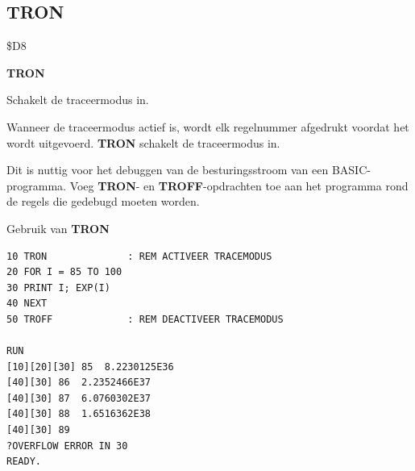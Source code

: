 \subsection{TRON}
\begin{description}[leftmargin=2cm,style=nextline]
\item [Token:]    \$D8

\item [Formaat:]   {\bf TRON}

\item [Gebruik:]    Schakelt de traceermodus in.

                  Wanneer de traceermodus actief is, wordt elk regelnummer afgedrukt voordat het wordt uitgevoerd. {\bf TRON} schakelt de traceermodus in.

                  Dit is nuttig voor het debuggen van de besturingsstroom van een BASIC-programma. Voeg {\bf TRON}- en {\bf TROFF}-opdrachten toe aan het programma rond de regels die gedebugd moeten worden.

\item [Voorbeeld:]  Gebruik van {\bf TRON}

\begin{tcolorbox}[colback=black,coltext=white]
\verbatimfont{\codefont}
\begin{verbatim}
10 TRON              : REM ACTIVEER TRACEMODUS
20 FOR I = 85 TO 100
30 PRINT I; EXP(I)
40 NEXT
50 TROFF             : REM DEACTIVEER TRACEMODUS

RUN
[10][20][30] 85  8.2230125E36
[40][30] 86  2.2352466E37
[40][30] 87  6.0760302E37
[40][30] 88  1.6516362E38
[40][30] 89
?OVERFLOW ERROR IN 30
READY.
\end{verbatim}
\end{tcolorbox}
\end{description}


\newpage

